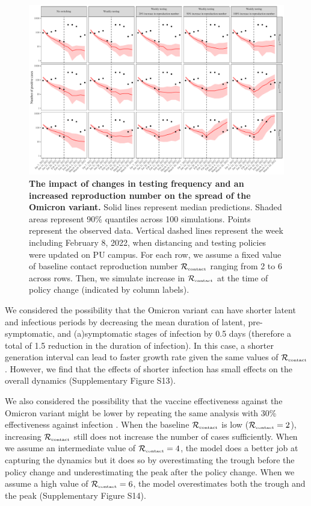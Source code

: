 \documentclass[12pt]{article}
\newcommand{\Rx}[1]{\ensuremath{{\mathcal R}_{#1}}}
\newcommand{\Rc}{\Rx{\textrm{\tiny{contact}}}}
\begin{document}
\begin{figure}[!ht]
\includegraphics[width=\textwidth]{../figure_princeton_new/figure_princeton_simulation_omicron_spring.pdf}
\caption{
\textbf{The impact of changes in testing frequency and an increased reproduction number on the spread of the Omicron variant.}
Solid lines represent median predictions.
Shaded areas represent 90\% quantiles across 100 simulations.
Points represent the observed data.
Vertical dashed lines represent the week including February 8, 2022, when distancing and testing policies were updated on PU campus.
For each row, we assume a fixed value of baseline contact reproduction number $\Rc$ ranging from 2 to 6 across rows.
Then, we simulate increase in $\Rc$ at the time of policy change (indicated by column labels).
}
\label{fig:omicron1}
\end{figure}

We considered the possibility that the Omicron variant can have shorter latent and infectious periods by decreasing the mean duration of latent, pre-symptomatic, and (a)symptomatic stages of infection by 0.5 days (therefore a total of 1.5 reduction in the duration of infection).
In this case, a shorter generation interval can lead to faster growth rate given the same values of $\Rc$ \citep{wallinga2007generation}.
However, we find that the effects of shorter infection has small effects on the overall dynamics (Supplementary Figure S13).

We also considered the possibility that the vaccine effectiveness against the Omicron variant might be lower by repeating the same analysis with 30\% effectiveness against infection \citep{tan2023vaccine}.
When the baseline $\Rc$ is low ($\Rc=2$), increasing $\Rc$ still does not increase the number of cases sufficiently.
When we assume an intermediate value of $\Rc=4$, the model does a better job at capturing the dynamics but it does so by overestimating the trough before the policy change and underestimating the peak after the policy change.
When we assume a high value of $\Rc=6$, the model overestimates both the trough and the peak (Supplementary Figure S14).
\end{document}
